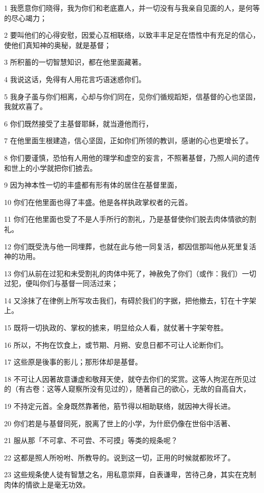 \par 1 我愿意你们晓得，我为你们和老底嘉人，并一切没有与我亲自见面的人，是何等的尽心竭力；
\par 2 要叫他们的心得安慰，因爱心互相联络，以致丰丰足足在悟性中有充足的信心，使他们真知神的奥秘，就是基督；
\par 3 所积蓄的一切智慧知识，都在他里面藏著。
\par 4 我说这话，免得有人用花言巧语迷惑你们。
\par 5 我身子虽与你们相离，心却与你们同在，见你们循规蹈矩，信基督的心也坚固，我就欢喜了。
\par 6 你们既然接受了主基督耶稣，就当遵他而行，
\par 7 在他里面生根建造，信心坚固，正如你们所领的教训，感谢的心也更增长了。
\par 8 你们要谨慎，恐怕有人用他的理学和虚空的妄言，不照著基督，乃照人间的遗传和世上的小学就把你们掳去。
\par 9 因为神本性一切的丰盛都有形有体的居住在基督里面，
\par 10 你们在他里面也得了丰盛。他是各样执政掌权者的元首。
\par 11 你们在他里面也受了不是人手所行的割礼，乃是基督使你们脱去肉体情欲的割礼。
\par 12 你们既受洗与他一同埋葬，也就在此与他一同复活，都因信那叫他从死里复活神的功用。
\par 13 你们从前在过犯和未受割礼的肉体中死了，神赦免了你们（或作：我们）一切过犯，便叫你们与基督一同活过来；
\par 14 又涂抹了在律例上所写攻击我们，有碍於我们的字据，把他撤去，钉在十字架上。
\par 15 既将一切执政的、掌权的掳来，明显给众人看，就仗著十字架夸胜。
\par 16 所以，不拘在饮食上，或节期、月朔、安息日都不可让人论断你们。
\par 17 这些原是後事的影儿；那形体却是基督。
\par 18 不可让人因著故意谦虚和敬拜天使，就夺去你们的奖赏。这等人拘泥在所见过的（有古卷：这等人窥察所没有见过的），随著自己的欲心，无故的自高自大，
\par 19 不持定元首。全身既然靠著他，筋节得以相助联络，就因神大得长进。
\par 20 你们若是与基督同死，脱离了世上的小学，为什麽仍像在世俗中活著、
\par 21 服从那「不可拿、不可尝、不可摸」等类的规条呢？
\par 22 这都是照人所吩咐、所教导的。说到这一切，正用的时候就都败坏了。
\par 23 这些规条使人徒有智慧之名，用私意崇拜，自表谦卑，苦待己身，其实在克制肉体的情欲上是毫无功效。

